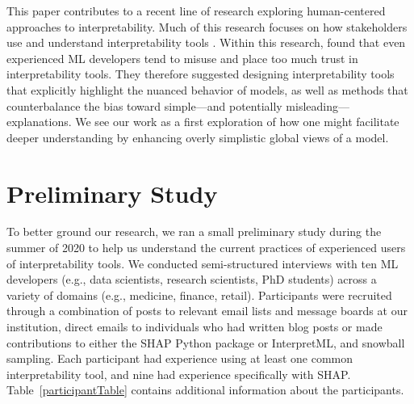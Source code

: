 \documentclass[11pt,dvipdfmx]{article}
\begin{document}
This paper contributes to a recent line of research exploring
human-centered approaches to interpretability. Much of this research
focuses on how stakeholders use and understand interpretability tools
\citep{Lim, Bunt, Bussone, Hohman, Lage, Abdul, Hullman,
  InterpretingInterpretability, Zhang, Poursabzi-Sangdeh,AM21,VW21}.
Within this research, \citet{InterpretingInterpretability} found that
even experienced ML developers tend to misuse and place too much trust
in interpretability tools. They therefore suggested designing
interpretability tools that explicitly highlight the nuanced behavior
of models, as well as methods that counterbalance the bias toward
simple---and potentially misleading---explanations. We see our work as
a first exploration of how one might facilitate deeper understanding
by enhancing overly simplistic global views of a model.



\section{Preliminary Study}
\label{sec:phase1}

To better ground our research, we ran a small preliminary study during
the summer of 2020 to help us understand the current practices of
experienced users of interpretability tools. We conducted
semi-structured interviews with ten ML developers (e.g., data
scientists, research scientists, PhD students) across a variety of
domains (e.g., medicine, finance, retail). Participants were recruited
through a combination of posts to relevant email lists and message
boards at our institution, direct emails to individuals who had
written blog posts or made contributions to either the SHAP Python
package or InterpretML, and snowball sampling.  Each participant had
experience using at least one common interpretability tool, and nine
had experience specifically with SHAP.  Table~\ref{participantTable}
contains additional information about the participants.
\end{document}
